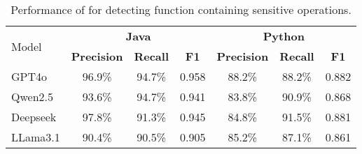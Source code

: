 \begin{table}[htb]
    \centering
    \caption{Performance of \system for detecting function containing sensitive operations.}
    \label{tab:eva:detection}
    \begin{tabular}{@{}lcccccc@{}}
        \toprule[1.5pt]
        \multirow{2}{*}{Model}       & \multicolumn{3}{c}{\textbf{Java}} & \multicolumn{3}{c}{\textbf{Python}} \\ \cmidrule(lr){2-4} \cmidrule(lr){5-7}
                    & \textbf{Precision} & \textbf{Recall}  & \textbf{F1}     & \textbf{Precision} & \textbf{Recall}  & \textbf{F1}     \\
                    \midrule[0.8pt]
        GPT4o      & 96.9\%   & 94.7\%  & 0.958 & 88.2\%   & 88.2\%  & 0.882 \\
        Qwen2.5    & 93.6\%   & 94.7\%  & 0.941 & 83.8\%   & 90.9\%  & 0.868 \\
        Deepseek     & 97.8\%   & 91.3\%  & 0.945 & 84.8\%   & 91.5\%  & 0.881 \\ 
        LLama3.1  & 90.4\%   & 90.5\%  & 0.905 & 85.2\%   & 87.1\%  & 0.861 \\
        \bottomrule[1.5pt]
    \end{tabular}
\end{table}